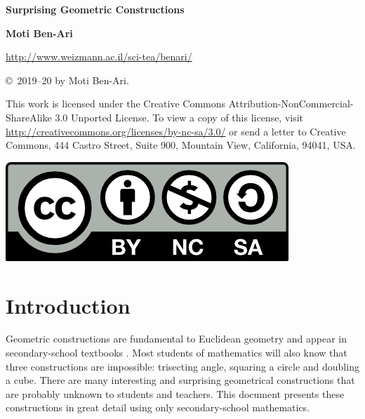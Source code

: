 
\thispagestyle{empty}

\begin{center}
\textbf{\LARGE Surprising Geometric Constructions}

\bigskip
\bigskip
\bigskip
\bigskip

\textbf{\Large Moti Ben-Ari}

\bigskip
\bigskip

\url{http://www.weizmann.ac.il/sci-tea/benari/}
\end{center}
\vfill

\begin{footnotesize}
\begin{center}
\copyright{}\ 2019--20 by Moti Ben-Ari.
\end{center}

This work is licensed under the Creative Commons Attribution-NonCommercial-ShareAlike 3.0 Unported License. To view a copy of this license, visit \url{http://creativecommons.org/licenses/by-nc-sa/3.0/} or send a letter to Creative Commons, 444 Castro Street, Suite 900, Mountain View, California, 94041, USA.
\end{footnotesize}

\bigskip

\begin{center}
\includegraphics[width=.15\textwidth]{by-nc-sa.png}
\end{center}

\newpage
\thispagestyle{empty}
\mbox{}
\newpage
\thispagestyle{empty}

\tableofcontents
\newpage
\mbox{}
\newpage


\chapter{Introduction}

Geometric constructions are fundamental to Euclidean geometry and appear in secondary-school textbooks \cite{geometry}. Most students of mathematics will also know that three constructions are impossible: trisecting angle, squaring a circle and doubling a cube. There are many interesting and surprising geometrical constructions that are probably unknown to students and teachers. This document presents these constructions in great detail using only secondary-school mathematics.

